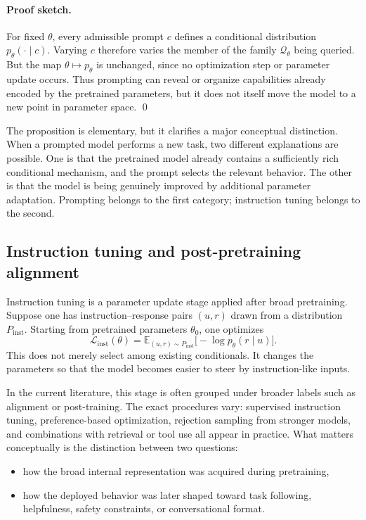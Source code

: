 \paragraph{Proof sketch.}
For fixed $\theta$, every admissible prompt $c$ defines a conditional distribution $p_{\theta}(\cdot \mid c)$.
Varying $c$ therefore varies the member of the family $\mathcal{Q}_{\theta}$ being queried.
But the map $\theta \mapsto p_{\theta}$ is unchanged, since no optimization step or parameter update occurs.
Thus prompting can reveal or organize capabilities already encoded by the pretrained parameters, but it does not itself move the model to a new point in parameter space.
\qed

The proposition is elementary, but it clarifies a major conceptual distinction.
When a prompted model performs a new task, two different explanations are possible.
One is that the pretrained model already contains a sufficiently rich conditional mechanism, and the prompt selects the relevant behavior.
The other is that the model is being genuinely improved by additional parameter adaptation.
Prompting belongs to the first category; instruction tuning belongs to the second.

\subsection*{Instruction tuning and post-pretraining alignment}

Instruction tuning is a parameter update stage applied after broad pretraining.
Suppose one has instruction--response pairs $(u,r)$ drawn from a distribution $P_{\mathrm{inst}}$.
Starting from pretrained parameters $\theta_0$, one optimizes
\[
\mathcal{L}_{\mathrm{inst}}(\theta)
=
\mathbb{E}_{(u,r)\sim P_{\mathrm{inst}}}
\bigl[-\log p_{\theta}(r \mid u)\bigr].
\]
This does not merely select among existing conditionals.
It changes the parameters so that the model becomes easier to steer by instruction-like inputs.

In the current literature, this stage is often grouped under broader labels such as alignment or post-training.
The exact procedures vary: supervised instruction tuning, preference-based optimization, rejection sampling from stronger models, and combinations with retrieval or tool use all appear in practice.
What matters conceptually is the distinction between two questions:
\begin{itemize}
    \item how the broad internal representation was acquired during pretraining,
    \item how the deployed behavior was later shaped toward task following, helpfulness, safety constraints, or conversational format.
\end{itemize}


